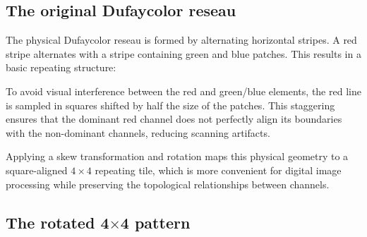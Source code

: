 \documentclass[a4paper,11pt]{article}
\newcommand{\tile}[6][]{%
  \if#4r\def\tilecol{cfared}\else
    \if#4g\def\tilecol{cfagreen}\else
      \if#4b\def\tilecol{cfablue}\else
        \def\tilecol{cfagrey}\fi\fi\fi
  \node[cfa-tile, fill=\tilecol!60, #1] (T#2#3) at (#2*0.8, -#3*0.8) {};
  \ifx&#5&\else\node[cfa-coords, above=0pt of T#2#3] {#5};\fi
  \ifx&#6&\else\node[cfa-weight] at (T#2#3) {#6};\fi
}
\begin{document}
\subsection{The original Dufaycolor reseau}
The physical Dufaycolor reseau is formed by alternating horizontal stripes. A red stripe alternates with a stripe containing green and blue patches. This results in a basic repeating structure:
\begin{center}
\end{center}
To avoid visual interference between the red and green/blue elements, the red line is sampled in squares shifted by half the size of the patches. This staggering ensures that the dominant red channel does not perfectly align its boundaries with the non-dominant channels, reducing scanning artifacts.

\begin{center}
\end{center}

Applying a skew transformation and rotation maps this physical geometry to a square-aligned $4\times4$ repeating tile, which is more convenient for digital image processing while preserving the topological relationships between channels.

\subsection{The rotated 4$\times$4 pattern}
\end{document}
